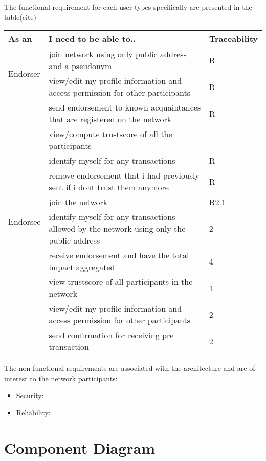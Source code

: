 The functional requirement for each user types specifically are presented 
in the table(cite)
\begin{center}
	\begin{tabular} {| l | p{9cm} | l |}
		\hline
		\textbf{As an}  & \textbf{I need to be able to..}   & \textbf{Traceability} \\
		\hline
		\multirow{2}{*}{Endorser} & join network using  only public address and a pseudonym& R \\\cline{2-3} 
		& view/edit my profile information and access permission 
		for other participants & R \\\cline{2-3}
		& send endorsement to known acquaintances that are registered 
		on the network & R \\\cline{2-3}
		& view/compute trustscore of all the participants &  \\\cline{2-3}
		& identify myself for any transactions  & R \\\cline{2-3}
		& remove endorsement that i had previously sent if i dont trust them 
		anymore & R \\\cline{2-3} 
		\hline
		\multirow{2}{*}{Endorsee} & join the network & R2.1 \\\cline{2-3}
		& identify myself for any transactions allowed by the network using only the public address & 2 \\\cline{2-3}
		& receive endorsement and have the total impact aggregated & 4 \\\cline{2-3}
		& view trustscore of all participants in the network & 1 \\\cline{2-3}
		& view/edit my profile information and access permission 
		for other participants & 2 \\\cline{2-3}
		& send confirmation for receiving pre transaction & 2 \\\cline{2-3}
		\hline
	\end{tabular}
\end{center}


The non-functional requirements are associated with the architecture and are 
of interest to the network participants: \\
\begin{itemize}
\item Security: 
\item Reliability:
\end{itemize}

\section{Component Diagram}



